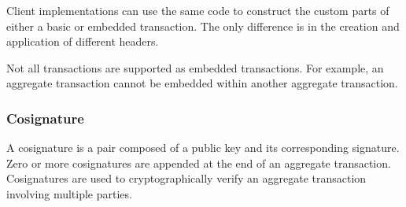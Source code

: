 Client implementations can use the same code to construct the custom parts of either a basic or embedded transaction.
The only difference is in the creation and application of different headers.

Not all transactions are supported as embedded transactions.
For example, an aggregate transaction cannot be embedded within another aggregate transaction.

\begin{figure}[H]
\end{figure}

\subsubsection{Cosignature}

A cosignature is a pair composed of a public key and its corresponding signature.
Zero or more cosignatures are appended at the end of an aggregate transaction.
Cosignatures are used to cryptographically verify an aggregate transaction involving multiple parties.

\begin{figure}[H]
\end{figure}

